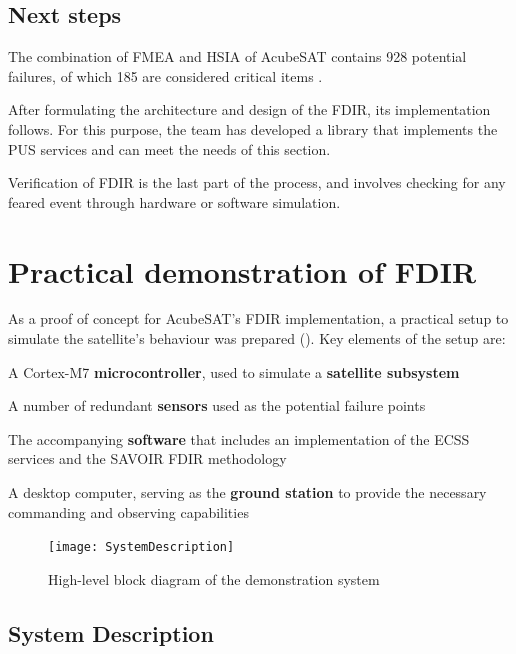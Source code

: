 \documentclass[a4paper,nobib]{tufte-book}
\begin{document}
\section{Next steps}
The combination of \acs{FMEA} and \acs{HSIA} of AcubeSAT contains 928 potential failures, of which 185 are considered critical items \autocite{retselis_acubesat_fmea_2020}.

After formulating the architecture and design of the \acs{FDIR}, its implementation follows. For this purpose, the team has developed a library that implements the \acs{PUS} services and can meet the needs of this section.

Verification of \acs{FDIR} is the last part of the process, and involves checking for any feared event through hardware or software simulation.

\chapter{Practical demonstration of \ac{FDIR}}
\label{cap:practical}

As a proof of concept for AcubeSAT's \ac{FDIR} implementation, a practical setup to simulate the satellite's behaviour was prepared (). Key elements of the setup are:
\begin{compactitem}
	\item A Cortex-M7 \textbf{microcontroller}, used to simulate a \textbf{satellite subsystem}
	\item A number of redundant \textbf{sensors} used as the potential failure points
	\item The accompanying \textbf{software} that includes an implementation of the \ac{ECSS} services and the \ac{SAVOIR} \ac{FDIR} methodology
	\item A desktop computer, serving as the \textbf{ground station} to provide the necessary commanding and observing capabilities
\end{compactitem}

\begin{figure}[h]
	\texttt{[image: SystemDescription]}
	\caption{High-level block diagram of the demonstration system}
	\label{fig:block}
\end{figure}

\section{System Description}
\end{document}
